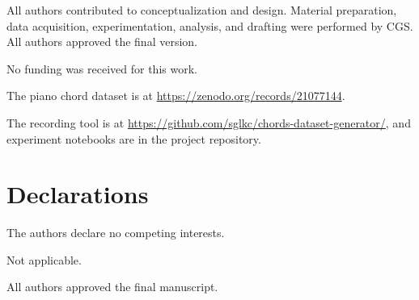 \documentclass[pdflatex,sn-mathphys-num,iicol]{sn-jnl}
\begin{document}
\backmatter

All authors contributed to conceptualization and design. Material preparation, data acquisition, experimentation, analysis, and drafting were performed by CGS. All authors approved the final version.

No funding was received for this work.

The piano chord dataset is at \url{https://zenodo.org/records/21077144}.

The recording tool is at \url{https://github.com/sglkc/chords-dataset-generator/}, and experiment notebooks are in the project repository.

\section*{Declarations}

The authors declare no competing interests.

Not applicable.

All authors approved the final manuscript.


\end{document}
